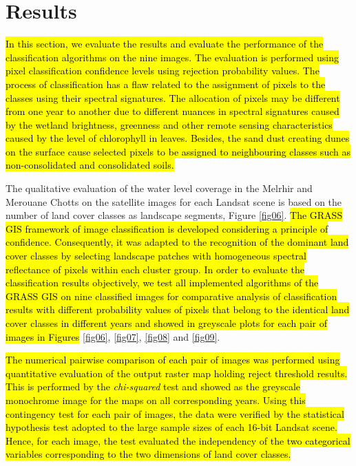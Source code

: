 \documentclass[asi,article,submit,pdftex,moreauthors]{Definitions/mdpi}
\begin{document}
\section{Results}

\hl{In this section, we evaluate the results and evaluate the performance of the classification algorithms on the nine images. The evaluation is performed using pixel classification confidence levels using rejection probability values. The process of classification has a flaw related to the assignment of pixels to the classes using their spectral signatures. The allocation of pixels may be different from one year to another due to different nuances in spectral signatures caused by the wetland brightness, greenness and other remote sensing characteristics caused by the level of chlorophyll in leaves. Besides, the sand dust creating dunes on the surface cause selected pixels to be assigned to neighbouring classes such as non-consolidated and consolidated soils.}

The qualitative evaluation of the water level coverage in the Melrhir and Merouane Chotts on the satellite images for each Landsat scene is based on the number of land cover classes as landscape segments, Figure \ref{fig06}. \hl{The GRASS GIS framework of image classification is developed considering a principle of confidence. Consequently, it was adapted to the recognition of the dominant land cover classes by selecting landscape patches with homogeneous spectral reflectance of pixels within each cluster group. In order to evaluate the classification results objectively, we test all implemented algorithms of the GRASS GIS on nine classified images for comparative analysis of classification results with different probability values of pixels that belong to the identical land cover classes in different years and showed in greyscale plots for each pair of images in Figures }\ref{fig06}, \ref{fig07}, \ref{fig08} and \ref{fig09}.

\hl{The numerical pairwise comparison of each pair of images was performed using quantitative evaluation of the output raster map holding reject threshold results. This is performed by the \emph{chi-squared} test and showed as the greyscale monochrome image for the maps on all corresponding years. Using this contingency test for each pair of images, the data were verified by the statistical hypothesis test adopted to the large sample sizes of each 16-bit Landsat scene. Hence, for each image,  the test evaluated the independency of the two categorical variables corresponding to the two dimensions of land cover classes.}
\end{document}
